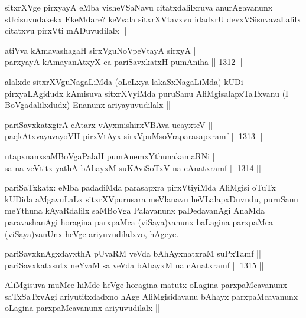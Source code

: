 \begin{artha}
sitxrXVge pirxyayA eMba visheVSaNavu citatxdalilxruva anurAgavanunx sUcisuvudakekx EkeMdare? keVvala sitxrXVtavxvu idadxrU devxVSisuvavaLalilx citatxvu pirxVti mADuvudilalx ||
\end{artha}

\begin{shl}
atiVva kAmavashagaH sirxVguNoVpeVtayA sirxyA || \\
parxyayA kAmayanAtxyX ca pariSavxkatxH pumAniha ||  1312 ||  
\end{shl}

\begin{artha}
alalxde sitxrXVguNagaLiMda (oLeLxya lakaSxNagaLiMda) kUDi pirxyaLAgidudx kAmisuva sitxrXVyiMda puruSanu AliMgisalapxTaTxvanu (I BoVgadalilxdudx) Enanunx ariyayuvudilalx ||
\end{artha}


\begin{shl}
pariSavxkatxgirA cAtarx vAyxmishirxVBAva ucayxteV || \\
paqkAtxvayavayoVH pirxVtAyx sirxVpuMsoVraparasapxramf ||  1313 ||  
\end{shl}
				
\begin{shl}
utapxnanxsaMBoVgaPalaH pumAnemxYthunakamaRNi || \\
sa na veVtitx yathA bAhayxM suKAviSoTxV na cA\s \s natxramf ||  1314 ||  
\end{shl}

\begin{artha}
pariSaTxkatx: eMba padadiMda parasapxra pirxVtiyiMda AliMgisi oTuTx kUDida aMgavuLaLx sitxrXVpurusara meVlanavu heVLalapxDuvudu, puruSanu meYthuna kAyaRdalilx saMBoVga Palavanunx paDedavanAgi AnaMda paravashanAgi horagina parxpaMca (viSaya)vanunx baLagina parxpaMca (viSaya)vanUnx heVge ariyuvudilalxvo, hAgeye.
\end{artha}

\begin{shl}
pariSavxknAgxdayxthA pUvaRM veVda bAhAyxnatxraM suPxTamf || \\
pariSavxkatxsutx neYvaM sa veVda bAhayxM na cA\s \s natxramf ||  1315 ||  
\end{shl}

\begin{artha}
AliMgisuva muMce hiMde heVge horagina matutx oLagina parxpaMcavanunx saTxSaTxvAgi ariyutitxdadxno hAge AliMgisidavanu bAhayx parxpaMcavanunx oLagina parxpaMcavanunx ariyuvudilalx ||
\end{artha}

